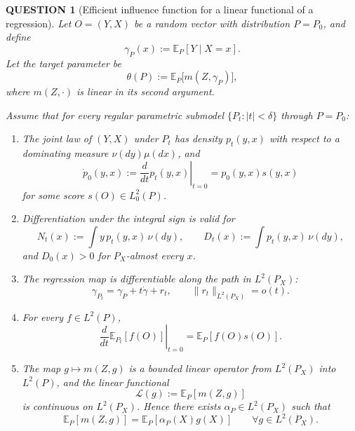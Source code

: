\documentclass[12pt]{article}
\renewcommand{\(}{\left(}%
\renewcommand{\)}{\right)}%
\renewcommand{\[}{\left[}%
\renewcommand{\]}{\right]}%
\newtheorem{question}{QUESTION}[section]}
\begin{document}
\begin{question}[Efficient influence function for a linear functional of a regression]
Let $O=(Y,X)$ be a random vector with distribution $P=P_0$, and define
\begin{equation*}
\gamma_P(x) := \mathbb{E}_P[Y \mid X=x].
\end{equation*}
Let the target parameter be
\begin{equation*}
\theta(P) := \mathbb{E}_P\big[m(Z,\gamma_P)\big],
\end{equation*}
where $m(Z,\cdot)$ is linear in its second argument.

Assume that for every regular parametric submodel $\{P_t:|t|<\delta\}$ through $P=P_0$:

\begin{enumerate}
\item[(i)] The joint law of $(Y,X)$ under $P_t$ has density $p_t(y,x)$ with respect to a dominating measure $\nu(dy)\mu(dx)$, and
\begin{equation*}
\dot p_0(y,x):=\left.\frac{d}{dt}p_t(y,x)\right|_{t=0}=p_0(y,x)s(y,x)
\end{equation*}
for some score $s(O)\in L^2_0(P)$.

\item[(ii)] Differentiation under the integral sign is valid for
\begin{equation*}
N_t(x):=\int y\,p_t(y,x)\,\nu(dy),
\qquad
D_t(x):=\int p_t(y,x)\,\nu(dy),
\end{equation*}
and $D_0(x)>0$ for $P_X$-almost every $x$.

\item[(iii)] The regression map is differentiable along the path in $L^2(P_X)$:
\begin{equation*}
\gamma_{P_t}=\gamma_P+t\dot\gamma+r_t,
\qquad
\|r_t\|_{L^2(P_X)}=o(t).
\end{equation*}

\item[(iv)] For every $f\in L^2(P)$,
\begin{equation*}
\left.\frac{d}{dt}\mathbb{E}_{P_t}[f(O)]\right|_{t=0}
=
\mathbb{E}_P[f(O)s(O)].
\end{equation*}

\item[(v)] The map $g\mapsto m(Z,g)$ is a bounded linear operator from $L^2(P_X)$ into $L^2(P)$, and the linear functional
\begin{equation*}
\mathcal L(g):=\mathbb{E}_P[m(Z,g)]
\end{equation*}
is continuous on $L^2(P_X)$. Hence there exists $\alpha_P\in L^2(P_X)$ such that
\begin{equation*}
\mathbb{E}_P[m(Z,g)]
=
\mathbb{E}_P[\alpha_P(X)g(X)]
\qquad
\forall g\in L^2(P_X).
\end{equation*}
\end{enumerate}


\end{question}
\end{document}
